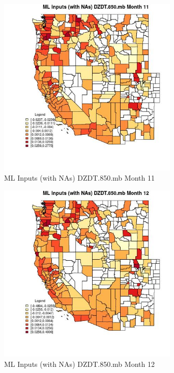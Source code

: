 \begin{figure} 
\centering  
\includegraphics[width=0.77\textwidth]{Code_Outputs/Report_ML_input_PM25_Step4_part_e_de_duplicated_aves_compiled_2019-05-21wNAs_CountyDZDT850mbmedianMonth11.jpg} 
\caption{\label{fig:Report_ML_input_PM25_Step4_part_e_de_duplicated_aves_compiled_2019-05-21wNAsCountyDZDT850mbmedianMonth11}ML Inputs (with NAs) DZDT.850.mb Month 11} 
\end{figure} 
 

\begin{figure} 
\centering  
\includegraphics[width=0.77\textwidth]{Code_Outputs/Report_ML_input_PM25_Step4_part_e_de_duplicated_aves_compiled_2019-05-21wNAs_CountyDZDT850mbmedianMonth12.jpg} 
\caption{\label{fig:Report_ML_input_PM25_Step4_part_e_de_duplicated_aves_compiled_2019-05-21wNAsCountyDZDT850mbmedianMonth12}ML Inputs (with NAs) DZDT.850.mb Month 12} 
\end{figure} 
 

